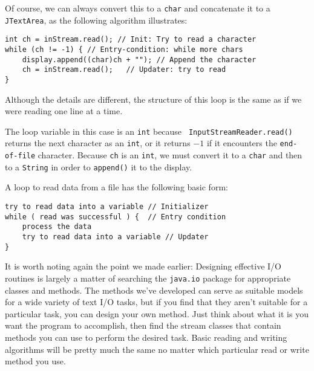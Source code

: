 \noindent Of course, we can always convert this to a {\tt char} and
concatenate it to a {\tt JTextArea}, as the following algorithm
illustrates:

\begin{jjjlisting}
\begin{lstlisting}
int ch = inStream.read(); // Init: Try to read a character
while (ch != -1) { // Entry-condition: while more chars
    display.append((char)ch + ""); // Append the character
    ch = inStream.read();   // Updater: try to read
}
\end{lstlisting}
\end{jjjlisting}

\noindent Although the details are different, the structure of this
loop is the same as if we were reading one line at a time.

The loop variable in this case is an {\tt int} because {\tt
InputStreamReader.\-read()} returns the next character as an {\tt int},
or it returns $-1$ if it encounters the {\tt end-of-file}
character.  Because {\tt ch} is an {\tt int}, we must convert it to a
{\tt char} and then to a {\tt String} in order to {\tt append()} it to the
display.

A loop to read data from a file has the following basic form:

\begin{jjjlisting}
\begin{lstlisting}
try to read data into a variable // Initializer
while ( read was successful ) {  // Entry condition
    process the data
    try to read data into a variable // Updater
}
\end{lstlisting}
\end{jjjlisting}



\noindent It is worth noting again the point we made earlier: Designing
effective I/O routines is largely a matter of searching the
{\tt java.io} package for appropriate classes and methods.  The methods
we've developed can serve as suitable models for a wide variety of text
I/O tasks, but if you find that they aren't suitable for a particular
task, you can design your own method.  Just think about what it
is you want the program to accomplish, then find the stream classes that
contain methods you can use to perform the desired task.  Basic
reading and writing algorithms will be pretty much the same no matter
which particular read or write method you use.

